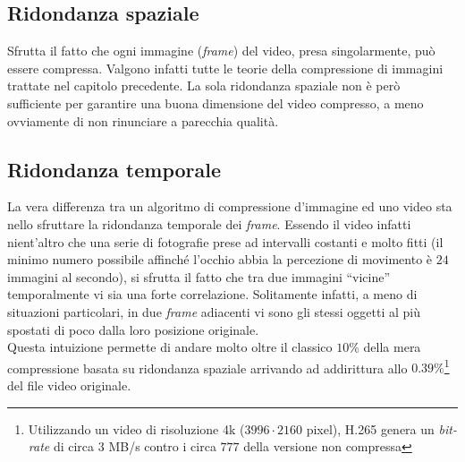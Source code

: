 
\subsection{Ridondanza spaziale}

Sfrutta il fatto che ogni immagine (\emph{frame}) del video, presa 
singolarmente, può essere compressa. Valgono infatti tutte le teorie della 
compressione di immagini trattate nel capitolo precedente.
La sola ridondanza spaziale non è però sufficiente per garantire una buona 
dimensione del video compresso, a meno ovviamente di non rinunciare a parecchia 
qualità.


\subsection{Ridondanza temporale}

La vera differenza tra un algoritmo di compressione d'immagine ed uno video sta 
nello sfruttare la ridondanza temporale dei \emph{frame}. Essendo il video 
infatti nient'altro che una serie di fotografie prese ad intervalli costanti e 
molto fitti (il minimo numero possibile affinché l'occhio abbia la percezione 
di movimento è $24$ immagini al secondo), si sfrutta il fatto che tra due 
immagini ``vicine'' temporalmente vi sia una forte correlazione. Solitamente 
infatti, a meno di situazioni particolari, in due \emph{frame} adiacenti vi 
sono gli stessi oggetti al più spostati di poco dalla loro posizione 
originale.\\

Questa intuizione permette di andare molto oltre il classico $10\%$ della mera 
compressione basata su ridondanza spaziale arrivando ad addirittura allo 
$0.39\%$\footnote{Utilizzando un video di risoluzione 4k ($3996 \cdot 2160$ 
pixel), H.265 genera un \emph{bit-rate} di circa $3$ MB/s contro i circa $777$ 
della versione non compressa} del file video originale. 


